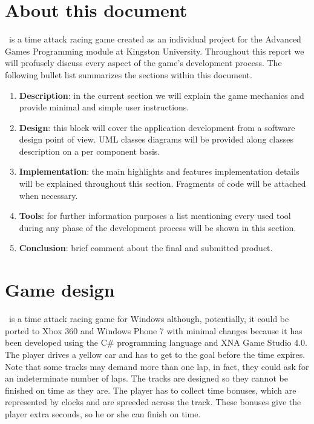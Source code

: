 
\section{About this document}

\game\ is a time attack racing game created as an individual project for the
Advanced Games Programming module at Kingston University. Throughout this
report we will profusely discuss every aspect of the game's development process.
The following bullet list summarizes the sections within this document.

\begin{enumerate}
	\item \textbf{Description}: in the current section we will explain the game
	mechanics and provide minimal and simple user instructions.
	\item \textbf{Design}: this block will cover the application development from
	a software design point of view. UML classes diagrams will be provided along classes
	description on a per component basis.
	\item \textbf{Implementation}: the main highlights and features implementation
	details will be explained throughout this section. Fragments of code will be
	attached when necessary.
	\item \textbf{Tools}: for further information purposes a list mentioning
	every used tool during any phase of the development process will be
	shown in this section.
	\item \textbf{Conclusion}: brief comment about the final and submitted product.
\end{enumerate}

\section{Game design}

\game\ is a time attack racing game for Windows although, potentially, it could be
ported to Xbox 360 and Windows Phone 7 with minimal changes because it has been
developed using the C\# programming language and XNA Game Studio 4.0.\\

The player drives a yellow car and has to get to the goal before the time expires.
Note that some tracks may demand more than one lap, in fact, they could ask for an
indeterminate number of laps. The tracks are designed so they cannot be finished
on time as they are. The player has to collect time bonuses, which are represented
by clocks and are spreeded across the track. These bonuses give the player extra seconds,
so he or she can finish on time.\\

